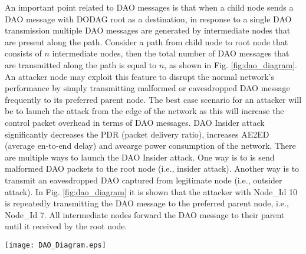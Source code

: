 \documentclass[conference, a4paper]{IEEEtran}
\begin{document}
 An important point related to DAO messages is that when a child node sends a DAO message with DODAG root as a destination, in response to a single DAO transmission multiple DAO messages are generated by intermediate nodes that are present along the path. Consider a path from child node to root node that consists of $n$ intermediate nodes, then the total number of DAO messages that are transmitted along the path is equal to $n$, as shown in Fig. \ref{fig:dao_diagram}. An attacker node may exploit this feature to disrupt the normal network's performance by simply transmitting malformed or eavesdropped DAO message frequently to its preferred parent node. The best case scenario for an attacker will be to launch the attack from the edge of the network as this will increase the control packet overhead in terms of DAO messages. DAO Insider attack significantly decreases the PDR  (packet delivery ratio), increases AE2ED (average en-to-end delay) and avearge power consumption of the network. There are multiple ways to launch the DAO Insider attack. One way is to is send malformed DAO packets to the root node (i.e., insider attack). Another way is to transmit an eavesdropped DAO captured from legitimate node (i.e., outsider attack). In Fig. \ref{fig:dao_diagram} it is shown that the attacker with Node\_Id 10 is repeatedly transmitting the DAO message to the preferred parent node, i.e., Node\_Id 7. All intermediate nodes forward the DAO message to their parent until it received by the root node. 

 \begin{figure*}
     \centering
     \texttt{[image: DAO\_Diagram.eps]}
     \caption{An illustration of DAO Insider Attack}
     \label{fig:dao_diagram}
 \end{figure*}
 
 
\end{document}
